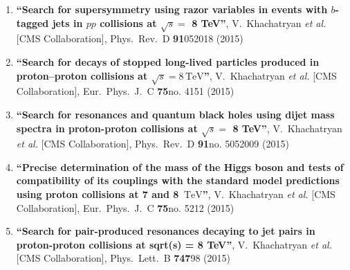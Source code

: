 \begin{enumerate}
\item%
{\bf ``Search for supersymmetry using razor variables in events with $b$-tagged jets in $pp$ collisions at $\sqrt{s} =$ 8 TeV''}, 
  V.~Khachatryan {\it et al.}  [CMS Collaboration], 
Phys.\ Rev.\ D {\bf 91}052018 (2015) %


\item%
  {\bf ``Search for decays of stopped long-lived particles produced in proton–proton collisions at $\sqrt{s}= 8\,\text {TeV} $''}, 
  V.~Khachatryan {\it et al.}  [CMS Collaboration], 
Eur.\ Phys.\ J.\ C {\bf 75}no. 4151 (2015) %


\item%
{\bf ``Search for resonances and quantum black holes using dijet mass spectra in proton-proton collisions at $\sqrt{s} =$ 8 TeV''}, 
  V.~Khachatryan {\it et al.}  [CMS Collaboration], 
Phys.\ Rev.\ D {\bf 91}no. 5052009 (2015) %


\item%
{\bf ``Precise determination of the mass of the Higgs boson and tests of compatibility of its couplings with the standard model predictions using proton collisions at 7 and 8 $\,\text {TeV}$''}, 
  V.~Khachatryan {\it et al.}  [CMS Collaboration], 
Eur.\ Phys.\ J.\ C {\bf 75}no. 5212 (2015) %


\item%
{\bf ``Search for pair-produced resonances decaying to jet pairs in proton-proton collisions at sqrt(s) = 8 TeV''}, 
  V.~Khachatryan {\it et al.}  [CMS Collaboration], 
Phys.\ Lett.\ B {\bf 747}98 (2015) %



\end{enumerate}
